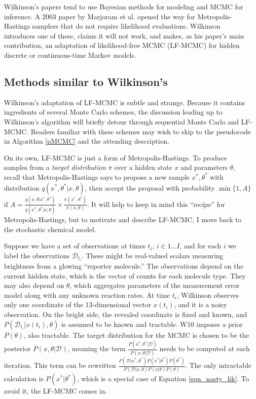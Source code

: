\documentclass{article}
\begin{document}
Wilkinson's papers tend to use Bayesian methods for modeling and MCMC for inference. A 2003 paper by Marjoram et al. \cite{Marjoram23122003} opened the way for Metropolis-Hastings samplers that do not require likelihood evaluations. Wilkinson introduces one of these, claims it will not work, and makes, as his paper's main contribution, an adaptation of likelihood-free MCMC (LF-MCMC) for hidden discrete or continuous-time Markov models.

\subsection{Methods similar to Wilkinson's}
\label{MC_backgr}
Wilkinson's adaptation of LF-MCMC is subtle and strange. Because it contains ingredients of several Monte Carlo schemes, the discussion leading up to Wilkinson's algorithm will briefly detour through sequential Monte Carlo and LF-MCMC. Readers familiar with these schemes may wish to skip to the pseudocode in Algorithm \ref{pMCMC} and the attending description. 

On its own, LF-MCMC is just a form of Metropolis-Hastings. To produce samples from a {\it target distribution} $\pi$ over a hidden state $x$ and parameters $\theta$, recall that Metropolis-Hastings says to propose a new sample $x^*, \theta^*$ with distribution $q(x^*, \theta^*|x, \theta)$, then accept the proposal with probability $\min \{1, A\}$ if $A=\frac{q(x, \theta|x^*, \theta^*)}{q(x^*, \theta^*|x, \theta)} \times \frac{\pi(x^*, \theta^*)}{\pi(x, \theta)}$. It will help to keep in mind this ``recipe'' for Metropolis-Hastings, but to motivate and describe LF-MCMC, I move back to the stochastic chemical model.

Suppose we have a set of observations at times $t_i$, $i \in 1...I$, and for each $i$ we label the observations $\mathcal{D}_{t_i}$. These might be real-valued scalars measuring brightness from a glowing ``reporter molecule.'' The observations depend on the current hidden state, which is the vector of counts for each molecule type. They may also depend on $\theta$, which aggregates parameters of the measurement error model along with any unknown reaction rates. At time $t_i$, Wilkinson observes only one coordinate of the 13-dimensional vector $x(t_i)$, and it is a noisy observation. On the bright side, the revealed coordinate is fixed and known, and $P(\mathcal{D}_{t_{i}}|x(t_i), \theta)$ is assumed to be known and tractable. W10 imposes a prior $P(\theta)$, also tractable. The target distribution for the MCMC is chosen to be the posterior $P(x, \theta|\mathcal{D})$, meaning the term $\frac{P(x^*, \theta^*|\mathcal{D})}{P(x, \theta|\mathcal{D})}$ needs to be computed at each iteration. This term can be rewritten $\frac{P(\mathcal{D}|x^*, \theta^*)P(x^*|\theta^*)P(\theta^*)}{P(\mathcal{D}|x, \theta)P(x| \theta)P(\theta)}$. The only intractable calculation is $P(x^*|\theta^*)$, which is a special case of Equation \ref{eqn_nasty_lik}. To avoid it, the LF-MCMC comes in.
\end{document}
